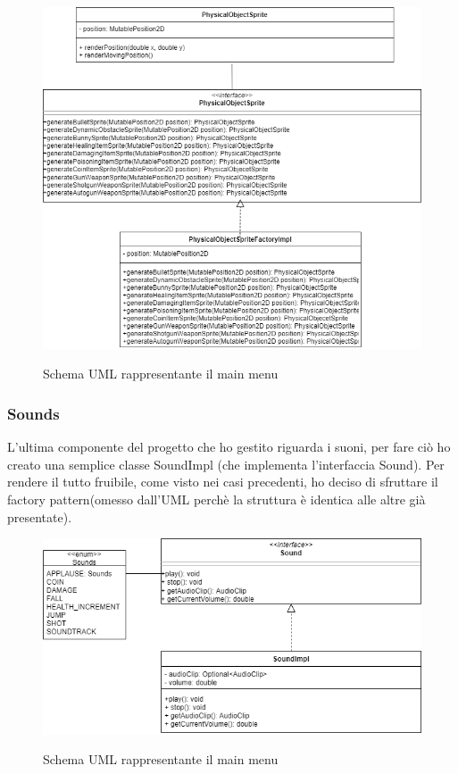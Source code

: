 \begin{figure}[H]
	\centering{}
	\includegraphics[width=\textwidth]{img/PhysicalObjectSprites.drawio}
	\label{img:PhysicalObjectSprites.drawio.png}
	\caption{Schema UML rappresentante il main menu\\}
\end{figure}

\subsubsection{Sounds}
L'ultima componente del progetto che ho gestito riguarda i suoni, per fare ciò ho creato una semplice classe SoundImpl (che implementa l'interfaccia Sound). Per rendere il tutto fruibile, come visto nei casi precedenti, ho deciso di sfruttare il factory pattern(omesso dall'UML perchè la struttura è identica alle altre già presentate).

\begin{figure}[H]
	\centering{}
	\includegraphics[width=\textwidth]{img/Sounds.drawio}
	\label{img:Sounds.drawio.png}
	\caption{Schema UML rappresentante il main menu\\}
\end{figure}

